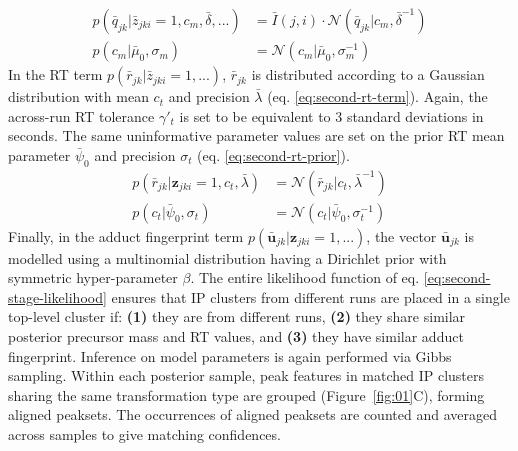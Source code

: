 \begin{align}
p({\bar{q}}_{jk}\vert\bar{z}_{jki}=1,c_m,\bar{\delta},...) &= \bar{I}(j,i) \cdot \mathcal{N}(\bar{q}_{jk} \vert c_m,\bar{\delta}^{-1}) \label{eq:second-mass-term}\\
p(c_m\vert \bar{\mu}_0,\sigma_m) &= \mathcal{N}(c_m \vert \bar{\mu}_0,\sigma_m^{-1}) \label{eq:second-mass-prior}
\end{align}
In the RT term $p({\bar{r}}_{jk}\vert\bar{z}_{jki}=1,...)$, ${\bar{r}}_{jk}$ is distributed according to a Gaussian distribution with mean $c_t$ and precision $\bar{\lambda}$ (eq. \ref{eq:second-rt-term}). Again, the across-run RT tolerance $\gamma'_t$ is set to be equivalent to 3 standard deviations in seconds. The same uninformative parameter values are set on the prior RT mean parameter $\bar{\psi}_0$ and precision $\sigma_t$ (eq. \ref{eq:second-rt-prior}).
\begin{align}
p({\bar{r}}_{jk}\vert\boldsymbol{z}_{jki}=1,c_t,\bar{\lambda}) &= \mathcal{N}({\bar{r}}_{jk} \vert c_t,\bar{\lambda}^{-1}) \label{eq:second-rt-term}\\
p(c_t\vert \bar{\psi}_0,\sigma_t) &= \mathcal{N}(c_t \vert \bar{\psi}_0,\sigma_t^{-1}) \label{eq:second-rt-prior}
\end{align}
Finally, in the adduct fingerprint term $p({\boldsymbol{\bar{u}}}_{jk}\vert\boldsymbol{z}_{jki}=1,...)$, the vector ${\boldsymbol{\bar{u}}}_{jk}$ is modelled using a multinomial distribution having a Dirichlet prior with symmetric hyper-parameter $\beta$.
The entire likelihood function of eq. \ref{eq:second-stage-likelihood} ensures that IP clusters from different runs are placed in a single top-level cluster if: \textbf{(1)} they are from different runs, \textbf{(2)} they share similar posterior precursor mass and RT values, and \textbf{(3)} they have similar adduct fingerprint. Inference on model parameters is again performed via Gibbs sampling. Within each posterior sample, peak features in matched IP clusters sharing the same transformation type are grouped (Figure~\ref{fig:01}C), forming aligned peaksets. The occurrences of aligned peaksets are counted and averaged across samples to give matching confidences.

